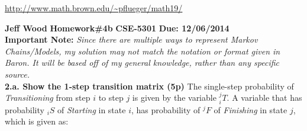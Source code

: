 \documentclass[a4paper,10pt]{article}
\newcommand{\st}[1]{\ensuremath{_{#1}{S}}}
\newcommand{\fin}[1]{\ensuremath{^{#1}{F}}}
\newcommand{\trans}[2]{\ensuremath{_{#1}^{#2}{T}}}
\begin{document}
\url{http://www.math.brown.edu/~pflueger/math19/}





\indent\indent\indent\indent\indent\indent\indent\indent\indent\indent\indent\indent\indent\indent\indent\indent\indent\indent\indent\indent\indent\indent\indent\indent\indent \textbf{Jeff Wood}\newline
\indent\indent\indent\indent\indent\indent\indent\indent\indent\indent\indent\indent\indent\indent\indent\indent\indent\indent\indent\indent\indent\indent\indent\indent\indent \textbf{Homework\#4b}\newline 
\indent\indent\indent\indent\indent\indent\indent\indent\indent\indent\indent\indent\indent\indent\indent\indent\indent\indent\indent\indent\indent\indent\indent\indent\indent \textbf{CSE-5301}\newline
\indent\indent\indent\indent\indent\indent\indent\indent\indent\indent\indent\indent\indent\indent\indent\indent\indent\indent\indent\indent\indent\indent\indent\indent\indent \textbf{Due: 12/06/2014}\newline
\\
\textbf{Important Note:}
\emph{Since there are multiple ways to represent Markov Chains/Models, my solution may not match the notation or format given in Baron. It will be based off of my general knowledge, rather than any specific source.}
\\
\newline\noindent
\textbf{2.a. Show the 1-step transition matrix (5p)}
\newline\noindent\newline\noindent
The single-step probability of \emph{Transitioning} from step $i$ to step $j$ is given by the variable $\trans{i}{j}$. 
A variable that has probability $\st{i}$ of \emph{Starting} in state $i$, has probability of $\fin{j}$ of \emph{Finishing} in state $j$, which is given as:
\newline\noindent\newline\noindent
\end{document}

